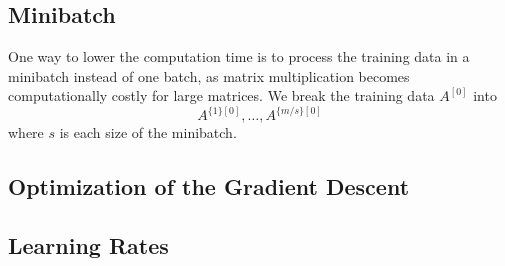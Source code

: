 \documentclass[a4paper]{article}
\begin{document}
\subsection{Minibatch}
One way to lower the computation time is to process the training data in a minibatch instead of one batch, as matrix multiplication becomes computationally costly for large matrices. We break the training data $A^{[0]}$ into $$A^{\{1\}[0]},\dots,A^{\{m/s\}[0]}$$ where $s$ is each size of the minibatch. 

\subsection{Optimization of the Gradient Descent}
\subsection{Learning Rates}
\end{document}

